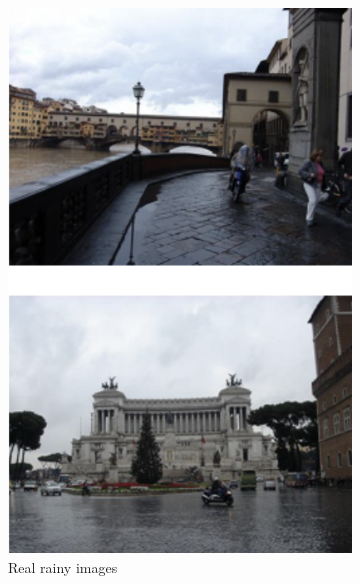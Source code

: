 \documentclass{article}
\begin{document}
\begin{figure}
	\begin{subfigure}{.5\textwidth}
		\centering
		\includegraphics[width=.9\linewidth]{images/v3_real_B.png}
		\caption{Real rainy images}
	\end{subfigure}
	\begin{subfigure}{.5\textwidth}
		\centering

\end{subfigure}
\end{figure}
\end{document}
